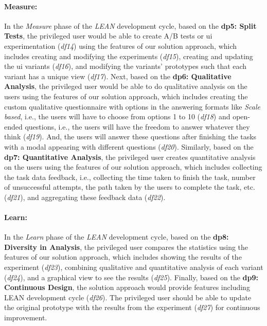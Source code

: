 \paragraph{Measure:}
In the \textit{Measure} phase of the \textit{LEAN} development cycle, based on the \textbf{\ac{dp}5: Split Tests}, the privileged user would be able to create A/B tests or \ac{ui} experimentation (\textit{\ac{df}14}) using the features of our solution approach, which includes creating and modifying the experiments (\textit{\ac{df}15}), creating and updating the \ac{ui} variants (\textit{\ac{df}16}), and modifying the variants' prototypes such that each variant has a unique view (\textit{\ac{df}17}).
Next, based on the \textbf{\ac{dp}6: Qualitative Analysis}, the privileged user would be able to do qualitative analysis on the users using the features of our solution approach, which includes creating the custom qualitative questionnaire with options in the answering formats like \textit{Scale based}, i.e., the users will have to choose from options 1 to 10 (\textit{\ac{df}18}) and open-ended questions, i.e., the users will have the freedom to answer whatever they think (\textit{\ac{df}19}). 
And, the users will answer these questions after finishing the tasks with a modal appearing with different questions (\textit{\ac{df}20}). 
Similarly, based on the \textbf{\ac{dp}7: Quantitative Analysis}, the privileged user creates quantitative analysis on the users using the features of our solution approach, which includes collecting the task data feedback, i.e., collecting the time taken to finish the task, number of unsuccessful attempts, the path taken by the users to complete the task, etc. (\textit{\ac{df}21}), and aggregating these feedback data (\textit{\ac{df}22}). 

\paragraph{Learn:}
In the \textit{Learn} phase of the \textit{LEAN} development cycle, based on the \textbf{\ac{dp}8: Diversity in Analysis}, the privileged user compares the statistics using the features of our solution approach, which includes showing the results of the experiment (\textit{\ac{df}23}), combining qualitative and quantitative analysis of each variant (\textit{\ac{df}24}), and a graphical view to see the results (\textit{\ac{df}25}). 
Finally, based on the \textbf{\ac{dp}9: Continuous Design}, the solution approach would provide features including LEAN development cycle (\textit{\ac{df}26}). 
The privileged user should be able to update the original prototype with the results from the experiment (\textit{\ac{df}27}) for continuous improvement.

